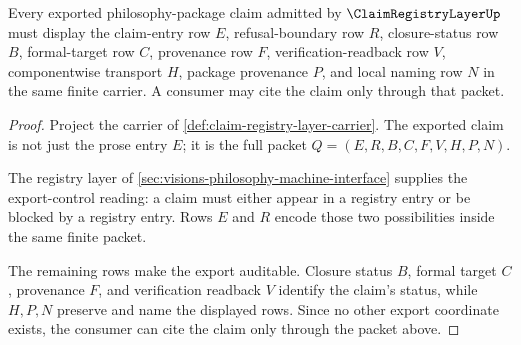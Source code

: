 \begin{theorem}
\label{thm:claim-registry-layer-export-control}
Every exported philosophy-package claim admitted by $\ClaimRegistryLayerUp$ must display the claim-entry row $E$, refusal-boundary row $R$, closure-status row $B$, formal-target row $C$, provenance row $F$, verification-readback row $V$, componentwise transport $H$, package provenance $P$, and local naming row $N$ in the same finite carrier. A consumer may cite the claim only through that packet.
\end{theorem}
\begin{proof}
Project the carrier of \autoref{def:claim-registry-layer-carrier}. The exported claim is not just the prose entry $E$; it is the full packet $Q=(E,R,B,C,F,V,H,P,N)$.

The registry layer of \autoref{sec:visions-philosophy-machine-interface} supplies the export-control reading: a claim must either appear in a registry entry or be blocked by a registry entry. Rows $E$ and $R$ encode those two possibilities inside the same finite packet.

The remaining rows make the export auditable. Closure status $B$, formal target $C$, provenance $F$, and verification readback $V$ identify the claim's status, while $H,P,N$ preserve and name the displayed rows. Since no other export coordinate exists, the consumer can cite the claim only through the packet above.
\end{proof}

